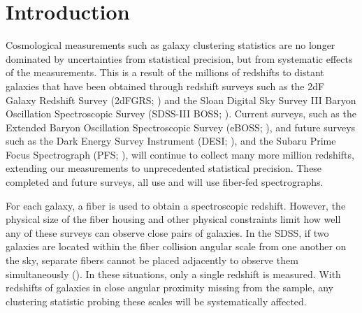 \section{Introduction} 
Cosmological measurements such as galaxy clustering statistics are
no longer dominated by uncertainties from statistical precision, but from 
systematic effects of the measurements. This is a result of the millions of 
redshifts to distant galaxies that have been obtained through redshift surveys
such as the 2dF Galaxy Redshift Survey (2dFGRS; \citealt{Colless:1999aa}) and 
the Sloan Digital Sky Survey III Baryon Oscillation Spectroscopic Survey 
(SDSS-III BOSS; \citealt{Anderson:2012aa, Dawson:2013aa}). Current surveys, 
such as the Extended Baryon Oscillation Spectroscopic Survey (eBOSS; \citealt{Dawson:2015aa}), 
and future surveys such as the Dark Energy Survey Instrument (DESI; \citealt{Schlegel:2011aa, 
Morales:2012aa, Makarem:2014aa}), and the Subaru Prime Focus Spectrograph 
(PFS; \citealt{Takada:2014aa}), 
will continue to collect many more million redshifts, extending our measurements 
to unprecedented statistical precision. These completed and future surveys, all use 
and will use fiber-fed spectrographs. 


For each galaxy, a fiber is used to obtain a spectroscopic redshift. However, 
the physical size of the fiber housing and other physical constraints limit 
how well any of these surveys can observe close pairs of galaxies. In the SDSS, 
if two galaxies are located within the fiber collision angular scale from 
one another on the sky, separate fibers cannot be placed adjacently to 
observe them simultaneously 
(\citealt{Yoon:2008aa}). In these situations, only a single redshift 
is measured. With redshifts of galaxies in close angular proximity missing 
from the sample, any clustering statistic probing these scales will be 
systematically affected. 

